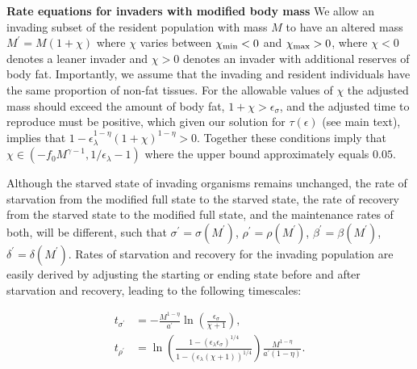 \documentclass[twocolumn,preprintnumbers,amsmath,amssymb,superscriptaddress]{revtex4}
\begin{document}
\begin{table}[h]
\begin{center}
\begin{tabular}{p{3.8cm} c p{2.2cm} p{1.4cm}}
   
   

   \hline
    \end{tabular}
    \end{center}
   \end{table}



{\bf Rate equations for invaders with modified body mass}
We allow an invading subset of the resident population with mass $M$ to have an altered mass $M^\prime = M(1+\chi)$ where $\chi$ varies between $\chi_{\rm min} <0$ and $\chi_{\rm max}>0$, where $\chi<0$ denotes a leaner invader and $\chi > 0$ denotes an invader with additional reserves of body fat.
Importantly, we assume that the invading and resident individuals have the same proportion of non-fat tissues.
For the allowable values of $\chi$ the adjusted mass should exceed the amount of body fat, $1+\chi>\epsilon_{\sigma}$, and the adjusted time to reproduce must be positive, which given our solution for $\tau(\epsilon)$ (see main text), implies that $1-\epsilon_{\lambda}^{1-\eta}\left(1+\chi\right)^{1-\eta}>0$.
Together these conditions imply that  $\chi\in(-f_0M^{\gamma-1},1/\epsilon_{\lambda}-1)$ where the upper bound approximately equals $0.05$.

Although the starved state of invading organisms remains unchanged, the rate of starvation from the modified full state to the starved state, the rate of recovery from the starved state to the modified full state, and the maintenance rates of both, will be different, such that $\sigma^\prime = \sigma(M^\prime)$, $\rho^\prime = \rho(M^\prime)$, $\beta^\prime = \beta(M^\prime)$, $\delta^\prime = \delta(M^\prime)$.
Rates of starvation and recovery for the invading population are easily derived by adjusting the starting or ending state before and after starvation and recovery, leading to the following timescales:

\begin{align}
t_{\sigma^\prime} &= -\frac{M^{1-\eta}}{a^{\prime}}\ln \left(\frac{\epsilon_\sigma}{\chi +1}\right), \\ \nonumber
t_{\rho^\prime} &= \ln \left(\frac{1-(\epsilon_\lambda \epsilon_\sigma)^{1/4}}{1-( \epsilon_\lambda(\chi +1))^{1/4}}\right)\frac{M^{1-\eta}}{a^{\prime}\left(1-\eta\right)}.
\end{align}
\end{document}
